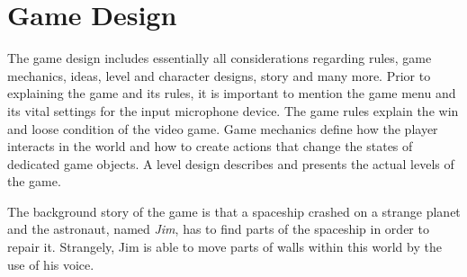 
\section{Game Design}\label{sec:game_design}
The game design includes essentially all considerations regarding rules, game mechanics, ideas, level and character designs, story and many more. 
Prior to explaining the game and its rules, it is important to mention the game menu and its vital settings for the input microphone device.
The game rules explain the win and loose condition of the video game.
Game mechanics define how the player interacts in the world and how to create actions that change the states of dedicated game objects.
A level design describes and presents the actual levels of the game.

The background story of the game is that a spaceship crashed on a strange planet and the astronaut, named \emph{Jim}, has to find parts of the spaceship in order to repair it.
Strangely, Jim is able to move parts of walls within this world by the use of his voice.




